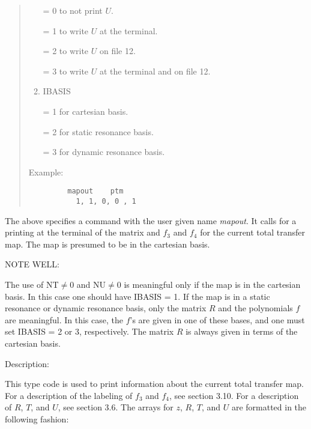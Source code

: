 \begin{quotation}
\begin{enumerate}
             = 0 to not print $U$.

             = 1 to write $U$ at the terminal.

             = 2 to write $U$ on file 12.

             = 3 to write $U$ at the terminal and on file 12.

      \item  IBASIS

             = 1 for cartesian basis.

             = 2 for static resonance basis.

             = 3 for dynamic resonance basis.
\end{enumerate}

\vspace{5mm}
\noindent Example:
\begin{verbatim}
         mapout    ptm
           1, 1, 0, 0 , 1
\end{verbatim}
\end{quotation}
The above specifies a command with the user given name {\em mapout}.  It calls
for a printing at the terminal of the matrix and $f_3$  and $f_4$  for the current
total transfer map.  The map is presumed to be in the cartesian basis.

\vspace{5mm}
     NOTE WELL:
\vspace{2mm}

         The use of NT$\neq0$ and NU$\neq 0$ is meaningful only if the map is in
the cartesian basis.  In this case one should have IBASIS = 1.  If the map
is in a static resonance or dynamic resonance basis, only the matrix $R$ and
the polynomials $f$ are meaningful.  In this case, the $f$'s are given in one
of these bases, and one must set IBASIS = 2 or 3, respectively.  The matrix
$R$ is always given in terms of the cartesian basis.

\vspace{5mm}
     Description:
\vspace{2mm}

     This type code is used to print information about the current
total transfer map.  For a description of the labeling of $f_3$ and $f_4$, see
section 3.10.  For a description of $R$, $T$, and $U$, see section 3.6.  The
arrays for $z$, $R$, $T$, and $U$ are formatted in the following fashion:


